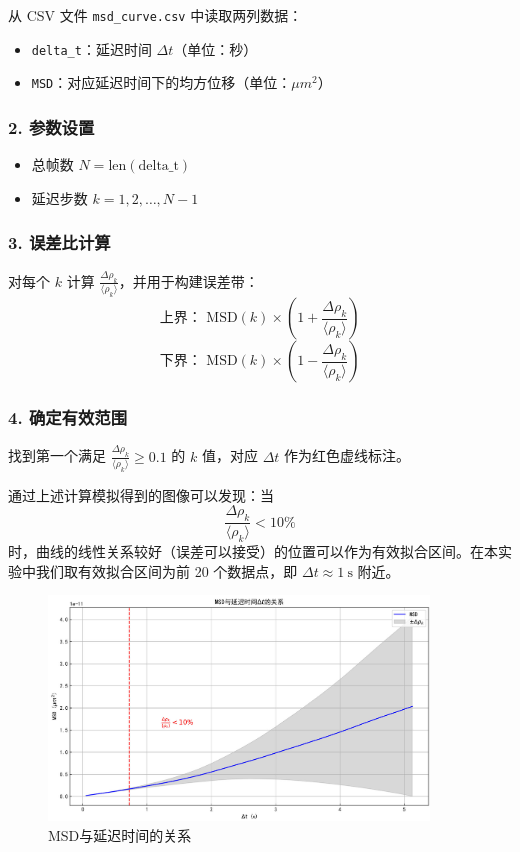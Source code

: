 \documentclass[a4paper]{report} %
\begin{document}
从 CSV 文件 \texttt{msd\_curve.csv} 中读取两列数据：
\begin{itemize}
    \item \texttt{delta\_t}：延迟时间 $\Delta t$（单位：秒）
    \item \texttt{MSD}：对应延迟时间下的均方位移（单位：$\mu m^2$）
\end{itemize}

\subsubsection*{2. 参数设置}

\begin{itemize}
    \item 总帧数 $N = \text{len}(\text{delta\_t})$
    \item 延迟步数 $k = 1, 2, \dots, N-1$
\end{itemize}

\subsubsection*{3. 误差比计算}

对每个 $k$ 计算 $\frac{\Delta \rho_k}{\langle \rho_k \rangle}$，并用于构建误差带：
\[
\text{上界： } \text{MSD}(k) \times \left(1 + \frac{\Delta \rho_k}{\langle \rho_k \rangle}\right)
\]
\[
\text{下界： } \text{MSD}(k) \times \left(1 - \frac{\Delta \rho_k}{\langle \rho_k \rangle}\right)
\]

\subsubsection*{4. 确定有效范围}

找到第一个满足 $\frac{\Delta \rho_k}{\langle \rho_k \rangle} \geq 0.1$ 的 $k$ 值，对应 $\Delta t$ 作为红色虚线标注。

通过上述计算模拟得到的图像可以发现：当 
\[
\frac{\Delta \rho_k}{\langle \rho_k \rangle} < 10\%
\]
时，曲线的线性关系较好（误差可以接受）的位置可以作为有效拟合区间。在本实验中我们取有效拟合区间为前 20 个数据点，即 $\Delta t \approx 1 \ \text{s}$ 附近。

\begin{figure}[H]
    \centering
    \includegraphics[width=0.9\textwidth]{取1.jpg}
    \caption{MSD与延迟时间的关系}
    \label{fig:let1}
\end{figure}
\end{document}
